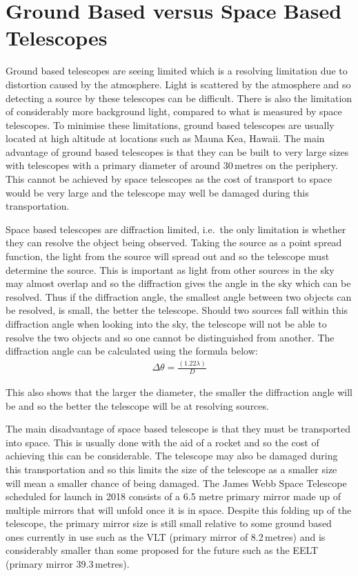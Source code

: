 \section{Ground Based versus Space Based Telescopes} %
\label{sec:ground_based_versus_space_based_telescopes}
	Ground based telescopes are seeing limited which is a resolving limitation due to distortion caused by the atmosphere. Light is scattered by the atmosphere and so detecting a source by these telescopes can be difficult. There is also the limitation of considerably more background light, compared to what is measured by space telescopes. To minimise these limitations, ground based telescopes are usually located at high altitude at locations such as Mauna Kea, Hawaii. The main advantage of ground based telescopes is that they can be built to very large sizes with telescopes with a primary diameter of around 30\,metres on the periphery. This cannot be achieved by space telescopes as the cost of transport to space would be very large and the telescope may well be damaged during this transportation.

	Space based telescopes are diffraction limited, i.e.\ the only limitation is whether they can resolve the object being observed. Taking the source as a point spread function, the light from the source will spread out and so the telescope must determine the source. This is important as light from other sources in the sky may almost overlap and so the diffraction gives the angle in the sky which can be resolved. Thus if the diffraction angle, the smallest angle between two objects can be resolved, is small, the better the telescope. Should two sources fall within this diffraction angle when looking into the sky, the telescope will not be able to resolve the two objects and so one cannot be distinguished from another. The diffraction angle can be calculated using the formula below:
	\begin{align}
		\Delta\theta= \frac{(1.22 \lambda)}D
	\end{align}

	This also shows that the larger the diameter, the smaller the diffraction angle will be and so the better the telescope will be at resolving sources.

	The main disadvantage of space based telescope is that they must be transported into space. This is usually done with the aid of a rocket and so the cost of achieving this can be considerable. The telescope may also be damaged during this transportation and so this limits the size of the telescope as a smaller size will mean a smaller chance of being damaged. The James Webb Space Telescope scheduled for launch in 2018 consists of a 6.5 metre primary mirror made up of multiple mirrors that will unfold once it is in space. Despite this folding up of the telescope, the primary mirror size is still small relative to some ground based ones currently in use such as the VLT (primary mirror of 8.2\,metres) and is considerably smaller than some proposed for the future such as the EELT (primary mirror 39.3\,metres).


